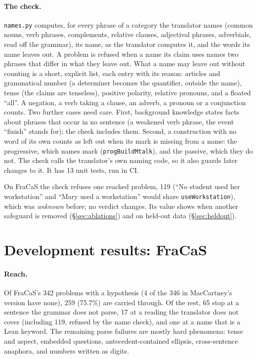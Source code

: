 \documentclass[11pt]{article}
\newcommand{\unk}{\textit{unknown}}
\newcommand{\nm}[1]{\texttt{#1}}
\begin{document}
\paragraph{The check.} \nm{names.py} computes, for every phrase of a
category the translator names (common nouns, verb phrases, complements,
relative clauses, adjectival phrases, adverbials, read off the grammar),
its name, as the translator computes it, and the words its name leaves
out. A problem is refused when a name its claim uses names two phrases
that differ in what they leave out. What a name may leave out without
counting is a short, explicit list, each entry with its reason: articles
and grammatical number (a determiner becomes the quantifier, outside the
name), tense (the claims are tenseless), positive polarity, relative
pronouns, and a floated ``all''. A negation, a verb taking a clause, an
adverb, a pronoun or a conjunction counts. Two further cases need care.
First, background knowledge states facts about phrases that occur in no
sentence (a weakened verb phrase, the event ``finish'' stands for); the
check includes them. Second, a construction with no word of its own
counts as left out when its mark is missing from a name: the
progressive, which names mark (\nm{progBuildMtalk}), and the passive,
which they do not. The check calls the translator's own naming code, so
it also guards later changes to it. It has 13 unit tests, run in CI.

On FraCaS the check refuses one reached problem, 119 (``No student used
her workstation'' and ``Mary used a workstation'' would share
\nm{useWorkstation}), which was \unk{} before; no verdict changes. Its
value shows when another safeguard is removed (\S\ref{sec:ablations})
and on held-out data (\S\ref{sec:heldout}).

\section{Development results: FraCaS}
\label{sec:fracas}

\paragraph{Reach.} Of FraCaS's 342 problems with a hypothesis (4 of the
346 in MacCartney's version have none), 259 (75.7\%) are carried
through. Of the rest, 65 stop at a sentence the grammar does not parse,
17 at a reading the translator does not cover (including 119, refused by
the name check), and one at a name that is a Lean keyword. The remaining
parse failures are mostly hard phenomena: tense and aspect,
embedded questions, antecedent-contained ellipsis, cross-sentence
anaphora, and numbers written as digits.
\end{document}

